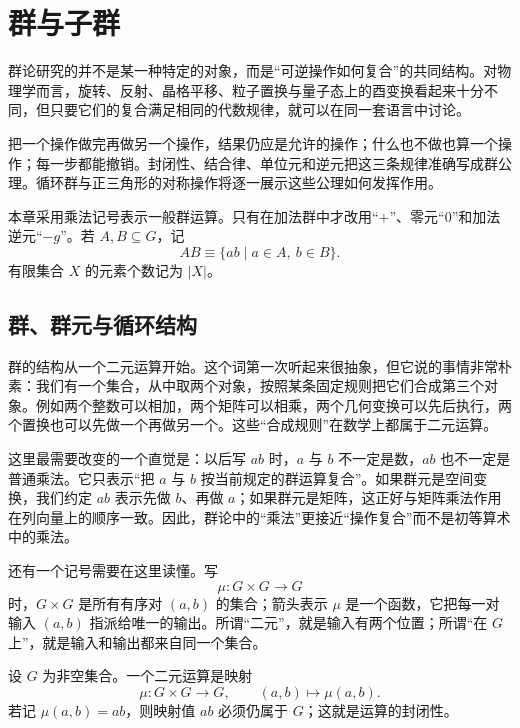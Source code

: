 \chapter{群与子群}
\label{chap:group-basics}

群论研究的并不是某一种特定的对象，而是“可逆操作如何复合”的共同结构。对物理学而言，旋转、反射、晶格平移、粒子置换与量子态上的酉变换看起来十分不同，但只要它们的复合满足相同的代数规律，就可以在同一套语言中讨论。

把一个操作做完再做另一个操作，结果仍应是允许的操作；什么也不做也算一个操作；每一步都能撤销。封闭性、结合律、单位元和逆元把这三条规律准确写成群公理。循环群与正三角形的对称操作将逐一展示这些公理如何发挥作用。

本章采用乘法记号表示一般群运算。只有在加法群中才改用“$+$”、零元“$0$”和加法逆元“$-g$”。若 $A,B\subseteq G$，记
\[
AB\equiv\{ab\mid a\in A,\ b\in B\}.
\]
有限集合 $X$ 的元素个数记为 $\lvert X\rvert$。
\section{群、群元与循环结构}
\label{sec:group-axioms}

群的结构从一个二元运算开始。这个词第一次听起来很抽象，但它说的事情非常朴素：我们有一个集合，从中取两个对象，按照某条固定规则把它们合成第三个对象。例如两个整数可以相加，两个矩阵可以相乘，两个几何变换可以先后执行，两个置换也可以先做一个再做另一个。这些“合成规则”在数学上都属于二元运算。

这里最需要改变的一个直觉是：以后写 $ab$ 时，$a$ 与 $b$ 不一定是数，$ab$ 也不一定是普通乘法。它只表示“把 $a$ 与 $b$ 按当前规定的群运算复合”。如果群元是空间变换，我们约定 $ab$ 表示先做 $b$、再做 $a$；如果群元是矩阵，这正好与矩阵乘法作用在列向量上的顺序一致。因此，群论中的“乘法”更接近“操作复合”而不是初等算术中的乘法。

还有一个记号需要在这里读懂。写
\[
\mu:G\times G\longrightarrow G
\]
时，$G\times G$ 是所有有序对 $(a,b)$ 的集合；箭头表示 $\mu$ 是一个函数，它把每一对输入 $(a,b)$ 指派给唯一的输出。所谓“二元”，就是输入有两个位置；所谓“在 $G$ 上”，就是输入和输出都来自同一个集合。

\begin{definition}[二元运算]
设 $G$ 为非空集合。一个二元运算是映射
\[
\mu:G\times G\longrightarrow G,
\qquad
(a,b)\longmapsto \mu(a,b).
\]
若记 $\mu(a,b)=ab$，则映射值 $ab$ 必须仍属于 $G$；这就是运算的封闭性。
\label{def:binary-operation}
\end{definition}

